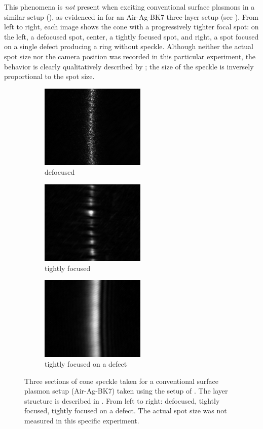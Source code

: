This phenomena is \textit{not} present when exciting conventional surface
plasmons in a similar setup (), as evidenced in
 for an Air-Ag-BK7 three-layer setup (see
).  From left to right, each image shows the cone
with a progressively tighter focal spot: on the left, a defocused spot,
center, a tightly focused spot, and right, a spot focused on a single defect
producing a ring without speckle.  Although neither the actual spot size nor
the camera position was recorded in this particular experiment, the behavior
is clearly qualitatively described by ; the size of
the speckle is inversely proportional to the spot size.
\begin{figure}[ht]
\centering
\begin{subfigure}[b]{5cm}
\includegraphics[keepaspectratio,width=5cm]{speckle/figures/Ag_BK7_cone_lens00_ccd-10.jpg}
\caption{defocused}
\end{subfigure}
\begin{subfigure}[b]{5cm}
\includegraphics[keepaspectratio,width=5cm]{speckle/figures/Ag_BK7_cone_lens10_ccd-5.jpg}
\caption{tightly focused}
\end{subfigure}
\begin{subfigure}[b]{5cm}
\includegraphics[keepaspectratio,width=5cm]{speckle/figures/Ag_LaSFN9_cone_lens10_ccd-153.jpg}
\caption{tightly focused on a defect}
\end{subfigure}
\caption{Three sections of cone speckle taken for a conventional surface
				plasmon setup (Air-Ag-BK7) taken using the setup of
				.  The layer structure is described in
				.  From left to right: defocused, tightly
focused, tightly focused on a defect.  The actual spot size was not measured
in this specific experiment.  }
\label{fig:threespecklesizes}
\end{figure}

